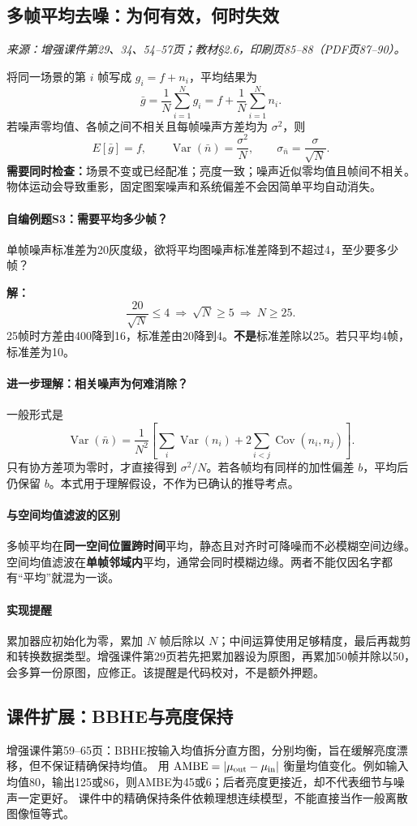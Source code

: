 \clearpage
\subsection{多帧平均去噪：为何有效，何时失效}
\textit{来源：增强课件第29、34、54--57页；教材\S2.6，印刷页85--88（PDF页87--90）。}

将同一场景的第 $i$ 帧写成 $g_i=f+n_i$，平均结果为
\[
\bar g=\frac1N\sum_{i=1}^{N}g_i=f+\frac1N\sum_{i=1}^{N}n_i.
\]
若噪声零均值、各帧之间不相关且每帧噪声方差均为 $\sigma^2$，则
\[
E[\bar g]=f,\qquad
\operatorname{Var}(\bar n)=\frac{\sigma^2}{N},\qquad
\sigma_{\bar n}=\frac{\sigma}{\sqrt N}.
\]
\textbf{需要同时检查：}场景不变或已经配准；亮度一致；噪声近似零均值且帧间不相关。物体运动会导致重影，固定图案噪声和系统偏差不会因简单平均自动消失。

\paragraph{自编例题S3：需要平均多少帧？}
单帧噪声标准差为20灰度级，欲将平均图噪声标准差降到不超过4，至少要多少帧？

\textbf{解：}
\[
\frac{20}{\sqrt N}\le4
\ \Longrightarrow\ \sqrt N\ge5
\ \Longrightarrow\ N\ge25.
\]
25帧时方差由400降到16，标准差由20降到4。\textbf{不是}标准差除以25。若只平均4帧，标准差为10。

\paragraph{进一步理解：相关噪声为何难消除？}
一般形式是
\[
\operatorname{Var}(\bar n)=\frac1{N^2}
\left[\sum_i\operatorname{Var}(n_i)+2\sum_{i<j}\operatorname{Cov}(n_i,n_j)\right].
\]
只有协方差项为零时，才直接得到 $\sigma^2/N$。若各帧均有同样的加性偏差 $b$，平均后仍保留 $b$。本式用于理解假设，不作为已确认的推导考点。

\paragraph{与空间均值滤波的区别}
多帧平均在\textbf{同一空间位置跨时间}平均，静态且对齐时可降噪而不必模糊空间边缘。空间均值滤波在\textbf{单帧邻域内}平均，通常会同时模糊边缘。两者不能仅因名字都有“平均”就混为一谈。

\paragraph{实现提醒}
累加器应初始化为零，累加 $N$ 帧后除以 $N$；中间运算使用足够精度，最后再裁剪和转换数据类型。增强课件第29页若先把累加器设为原图，再累加50帧并除以50，会多算一份原图，应修正。该提醒是代码校对，不是额外押题。


\subsection{课件扩展：BBHE与亮度保持}
增强课件第59--65页：BBHE按输入均值拆分直方图，分别均衡，旨在缓解亮度漂移，但不保证精确保持均值。
用 $\mathrm{AMBE}=|\mu_{\rm out}-\mu_{\rm in}|$ 衡量均值变化。例如输入均值80，输出125或86，则AMBE为45或6；后者亮度更接近，却不代表细节与噪声一定更好。
课件中的精确保持条件依赖理想连续模型，不能直接当作一般离散图像恒等式。
